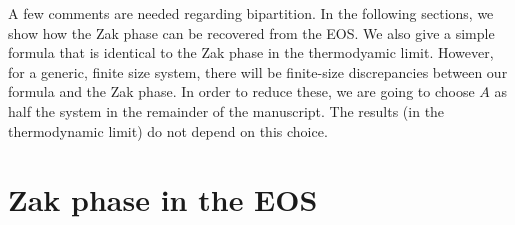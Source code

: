 \documentclass[twocolumn,amsmath,longbibliography,amssymb,superscriptaddress]{revtex4-1}
\newcommand{\mariac}[1]{{\it\color{cyan}#1}}
\begin{document}



A few comments are needed regarding  bipartition. 
In the following sections, we show how the Zak phase can be recovered from the EOS.
We also give a simple formula that is identical to the Zak phase in the thermodyamic limit.  
However, for a generic, finite size system, there will be finite-size discrepancies between our formula and the Zak phase.
In order to reduce these, we are going to choose $A$ as half the system in the remainder of the manuscript.
The results (in the thermodynamic limit) do not depend on this choice. 
\section{Zak phase in the EOS}
\end{document}
